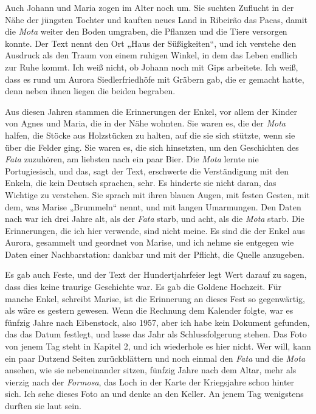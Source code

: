 \documentclass[
  ngerman,
  11pt,
  openany]{book}
\begin{document}
Auch Johann und Maria zogen im Alter noch um. Sie suchten Zuflucht in
der Nähe der jüngsten Tochter und kauften neues Land in Ribeirão das
Pacas, damit die \emph{Mota} weiter den Boden umgraben, die Pflanzen und
die Tiere versorgen konnte. Der Text nennt den Ort „Haus der
Süßigkeiten``, und ich verstehe den Ausdruck als den Traum von einem
ruhigen Winkel, in dem das Leben endlich zur Ruhe kommt. Ich weiß nicht,
ob Johann noch mit Gips arbeitete. Ich weiß, dass es rund um Aurora
Siedlerfriedhöfe mit Gräbern gab, die er gemacht hatte, denn neben ihnen
liegen die beiden begraben.

Aus diesen Jahren stammen die Erinnerungen der Enkel, vor allem der
Kinder von Agnes und Maria, die in der Nähe wohnten. Sie waren es, die
der \emph{Mota} halfen, die Stöcke aus Holzstücken zu halten, auf die
sie sich stützte, wenn sie über die Felder ging. Sie waren es, die sich
hinsetzten, um den Geschichten des \emph{Fata} zuzuhören, am liebsten
nach ein paar Bier. Die \emph{Mota} lernte nie Portugiesisch, und das,
sagt der Text, erschwerte die Verständigung mit den Enkeln, die kein
Deutsch sprachen, sehr. Es hinderte sie nicht daran, das Wichtige zu
verstehen. Sie sprach mit ihren blauen Augen, mit festen Gesten, mit
dem, was Marise „Brummeln`` nennt, und mit langen Umarmungen. Den Daten
nach war ich drei Jahre alt, als der \emph{Fata} starb, und acht, als
die \emph{Mota} starb. Die Erinnerungen, die ich hier verwende, sind
nicht meine. Es sind die der Enkel aus Aurora, gesammelt und geordnet
von Marise, und ich nehme sie entgegen wie Daten einer Nachbarstation:
dankbar und mit der Pflicht, die Quelle anzugeben.

Es gab auch Feste, und der Text der Hundertjahrfeier legt Wert darauf zu
sagen, dass dies keine traurige Geschichte war. Es gab die Goldene
Hochzeit. Für manche Enkel, schreibt Marise, ist die Erinnerung an
dieses Fest so gegenwärtig, als wäre es gestern gewesen. Wenn die
Rechnung dem Kalender folgte, war es fünfzig Jahre nach Eibenstock, also
1957, aber ich habe kein Dokument gefunden, das das Datum festlegt, und
lasse das Jahr als Schlussfolgerung stehen. Das Foto von jenem Tag steht
in Kapitel 2, und ich wiederhole es hier nicht. Wer will, kann ein paar
Dutzend Seiten zurückblättern und noch einmal den \emph{Fata} und die
\emph{Mota} ansehen, wie sie nebeneinander sitzen, fünfzig Jahre nach
dem Altar, mehr als vierzig nach der \emph{Formosa}, das Loch in der
Karte der Kriegsjahre schon hinter sich. Ich sehe dieses Foto an und
denke an den Keller. An jenem Tag wenigstens durften sie laut sein.
\end{document}
